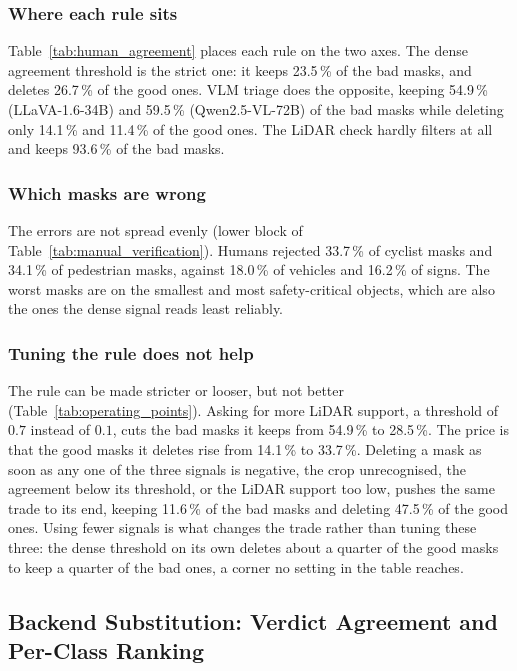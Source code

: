 \documentclass[journal]{IEEEtran}
\begin{document}
\subsubsection{Where each rule sits}
Table~\ref{tab:human_agreement} places each rule on the two axes.
The dense agreement threshold is the strict one: it keeps 23.5\,\% of the bad masks, and deletes 26.7\,\% of the good ones.
VLM triage does the opposite, keeping 54.9\,\% (LLaVA-1.6-34B) and 59.5\,\% (Qwen2.5-VL-72B) of the bad masks while deleting only 14.1\,\% and 11.4\,\% of the good ones.
The LiDAR check hardly filters at all and keeps 93.6\,\% of the bad masks.

\subsubsection{Which masks are wrong}
The errors are not spread evenly (lower block of Table~\ref{tab:manual_verification}).
Humans rejected 33.7\,\% of cyclist masks and 34.1\,\% of pedestrian masks, against 18.0\,\% of vehicles and 16.2\,\% of signs.
The worst masks are on the smallest and most safety-critical objects, which are also the ones the dense signal reads least reliably.

\subsubsection{Tuning the rule does not help}
The rule can be made stricter or looser, but not better (Table~\ref{tab:operating_points}).
Asking for more LiDAR support, a threshold of $0.7$ instead of $0.1$, cuts the bad masks it keeps from 54.9\,\% to 28.5\,\%.
The price is that the good masks it deletes rise from 14.1\,\% to 33.7\,\%.
Deleting a mask as soon as any one of the three signals is negative, the crop unrecognised, the agreement below its threshold, or the LiDAR support too low, pushes the same trade to its end, keeping 11.6\,\% of the bad masks and deleting 47.5\,\% of the good ones.
Using fewer signals is what changes the trade rather than tuning these three: the dense threshold on its own deletes about a quarter of the good masks to keep a quarter of the bad ones, a corner no setting in the table reaches.






\subsection{Backend Substitution: Verdict Agreement and Per-Class Ranking}
\label{exp:backends}
\end{document}
